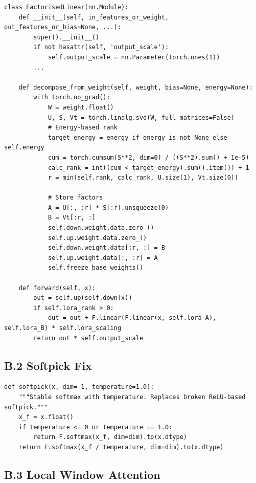 \begin{lstlisting}
class FactorisedLinear(nn.Module):
    def __init__(self, in_features_or_weight, out_features_or_bias=None, ...):
        super().__init__()
        if not hasattr(self, 'output_scale'):
            self.output_scale = nn.Parameter(torch.ones(1))
        ...
    
    def decompose_from_weight(self, weight, bias=None, energy=None):
        with torch.no_grad():
            W = weight.float()
            U, S, Vt = torch.linalg.svd(W, full_matrices=False)
            # Energy-based rank
            target_energy = energy if energy is not None else self.energy
            cum = torch.cumsum(S**2, dim=0) / ((S**2).sum() + 1e-5)
            calc_rank = int((cum < target_energy).sum().item()) + 1
            r = min(self.rank, calc_rank, U.size(1), Vt.size(0))
            
            # Store factors
            A = U[:, :r] * S[:r].unsqueeze(0)
            B = Vt[:r, :]
            self.down.weight.data.zero_()
            self.up.weight.data.zero_()
            self.down.weight.data[:r, :] = B
            self.up.weight.data[:, :r] = A
            self.freeze_base_weights()
    
    def forward(self, x):
        out = self.up(self.down(x))
        if self.lora_rank > 0:
            out = out + F.linear(F.linear(x, self.lora_A), self.lora_B) * self.lora_scaling
        return out * self.output_scale
\end{lstlisting}

\subsection{B.2 Softpick Fix}

\begin{lstlisting}
def softpick(x, dim=-1, temperature=1.0):
    """Stable softmax with temperature. Replaces broken ReLU-based softpick."""
    x_f = x.float()
    if temperature <= 0 or temperature == 1.0:
        return F.softmax(x_f, dim=dim).to(x.dtype)
    return F.softmax(x_f / temperature, dim=dim).to(x.dtype)
\end{lstlisting}

\subsection{B.3 Local Window Attention}

